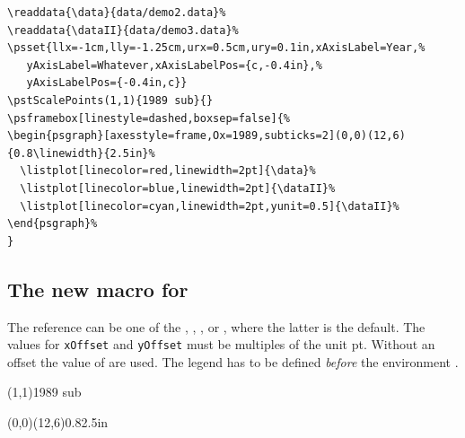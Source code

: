 \documentclass[11pt,english,BCOR=10mm,DIV=12,bibliography=totoc,parskip=false,headings=small,
    headinclude=false,footinclude=false,twoside]{pst-doc}
\begin{document}
\begin{lstlisting}
\readdata{\data}{data/demo2.data}%
\readdata{\dataII}{data/demo3.data}%
\psset{llx=-1cm,lly=-1.25cm,urx=0.5cm,ury=0.1in,xAxisLabel=Year,%
   yAxisLabel=Whatever,xAxisLabelPos={c,-0.4in},%
   yAxisLabelPos={-0.4in,c}}
\pstScalePoints(1,1){1989 sub}{}
\psframebox[linestyle=dashed,boxsep=false]{%
\begin{psgraph}[axesstyle=frame,Ox=1989,subticks=2](0,0)(12,6){0.8\linewidth}{2.5in}%
  \listplot[linecolor=red,linewidth=2pt]{\data}%
  \listplot[linecolor=blue,linewidth=2pt]{\dataII}%
  \listplot[linecolor=cyan,linewidth=2pt,yunit=0.5]{\dataII}%
\end{psgraph}%
}
\end{lstlisting}

\subsection{The new macro  for }\label{pslegend}

\begin{BDef}
\end{BDef}

The reference can be one of the , , , or , where the
latter is the default. The values for \texttt{xOffset} and \texttt{yOffset} must be multiples of the unit pt.
Without an offset the value of  are used.
The legend has to be defined \emph{before} the environment .

\medskip
\begin{center}
%
%
\pstScalePoints(1,1){1989 sub}{}
\begin{psgraph}[axesstyle=frame,Ox=1989,subticks=2](0,0)(12,6){0.8\linewidth}{2.5in}%
  \listplot[linecolor=red,linewidth=2pt]{\data}%
  \listplot[linecolor=blue,linewidth=2pt]{\dataII}%
  \listplot[linecolor=cyan,linewidth=2pt,yunit=0.5]{\dataII}%
\end{psgraph}%
\end{center}
\end{document}
